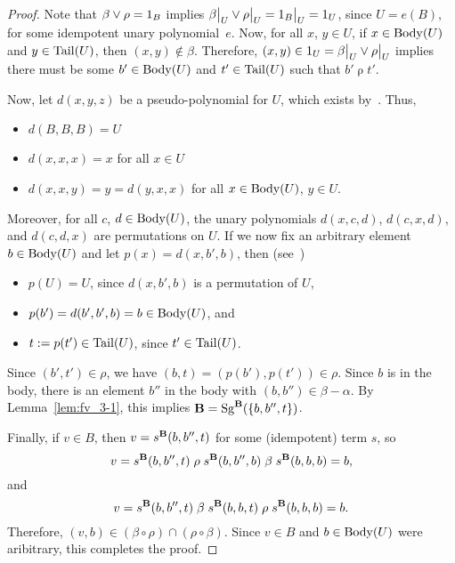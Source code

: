 \documentclass{ws-ijac}
\begin{document}
\newcommand\rhosig{\ensuremath{\rho}}
\begin{proof}
\noindent Note that
$\beta \join \rho = 1_B$ implies
$\restr{\beta}{U} \join \restr{\rho}{U} = \restr{1_B}{U} = 1_U$,
since $U = e(B)$, for some idempotent unary polynomial~$e$.
Now, for all $x$, $y \in U$, if $x\in \operatorname{Body}(U)$ and $y\in \operatorname{Tail}(U)$, then
$(x,y) \notin \beta$.  Therefore,
$(x, y) \in  1_U = \restr{\beta}{U} \join \restr{\rho}{U}$ implies
there must be some $b' \in \operatorname{Body}(U)$ and $t'\in \operatorname{Tail}(U)$ such that
$b' \mathrel{\rho} t'$.

Now, let $d(x,y,z)$ be a pseudo-\malcev polynomial for $U$,
which exists by~\cite[Lemma~4.20]{HM:1988}.
Thus,
\begin{itemize}
\item $d(B,B,B) = U$
\item $d(x,x,x) = x$ for all $x\in U$
\item $d(x,x,y) = y = d(y,x,x)$ for all $x\in \operatorname{Body}(U)$, $y \in U$.
\end{itemize}
Moreover, for all $c$, $d \in \operatorname{Body}(U)$, the unary polynomials
$d(x,c,d)$, $d(c,x,d)$, and $d(c,d,x)$ are permutations on $U$.
If we now fix an arbitrary element $b\in \operatorname{Body}(U)$ and
let $p(x) = d(x,b',b)$, then (see~\cite[Lemma~4.20]{HM:1988})
\begin{itemize}
\item  $p(U) = U$, since $d(x, b', b)$ is a permutation of $U$, %
\item $p(b') = d(b',b',b) = b \in \operatorname{Body}(U)$, and
\item  $t:=p(t')\in \operatorname{Tail}(U)$, since $t'\in \operatorname{Tail}(U)$.
\end{itemize}
Since $(b',t') \in \rho$, we have $(b, t) = (p(b'), p(t')) \in \rho$.
Since $b$ is in the body, there is an element $b''$ in the body with
$(b,b'') \in \beta - \alpha$. By Lemma~\ref{lem:fv_3-1}, this implies
$\mathbf{B} = \operatorname{Sg}^{\mathbf{B}}(\{b, b'', t\})$.

Finally, if $v \in B$, then $v = s^{\mathbf{B}}(b,b'',t)$ for
some (idempotent) term $s$, so
\[
v = s^{\mathbf{B}}(b,b'',t)
\mathrel{\rho} s^{\mathbf{B}}(b,b'',b)
\mathrel{\beta} s^{\mathbf{B}}(b,b,b) = b,
\]
and
\[
v = s^{\mathbf{B}}(b,b'',t)
\mathrel{\beta}  s^{\mathbf{B}}(b,b,t)
\mathrel{\rho}s^{\mathbf{B}}(b,b, b)  = b.
\]
Therefore,
$(v,b) \in  (\beta \circ \rho) \cap (\rho \circ \beta)$.
Since $v \in B$ and $b\in \operatorname{Body}(U)$ were aribitrary,
this completes the proof.
\end{proof}
\end{document}
